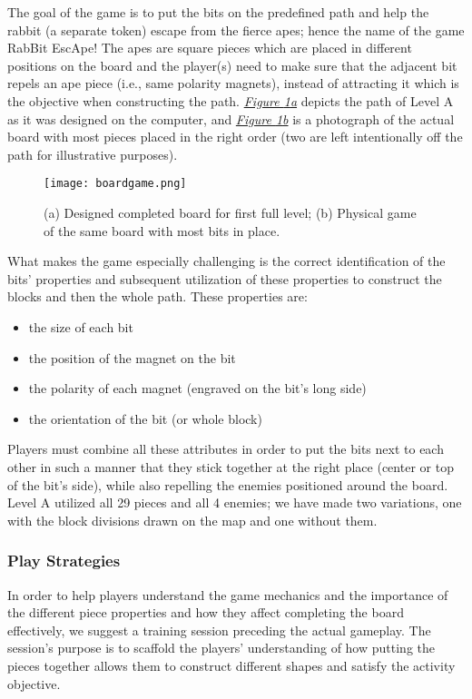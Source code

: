 \documentclass{acm_proc_article-sp}
\begin{document}
The goal of the game is to put the bits on the predefined path and help the rabbit (a separate token) escape from the fierce apes; hence the name of the game RabBit EscApe!
The apes are square pieces which are placed in different positions on the board and the player(s) need to make sure that the adjacent bit repels an ape piece (i.e., same polarity magnets), instead of attracting it which is the objective when constructing the path. 
{\em \hyperref[fig:board-game]{Figure \ref{fig:board-game}a}} depicts the path of Level A as it was designed on the computer, and {\em \hyperref[fig:board-game]{Figure \ref{fig:board-game}b}} is a photograph of the actual board with most pieces placed in the right order (two are left intentionally off the path for illustrative purposes).
\begin{figure}
  \texttt{[image: boardgame.png]}
  \caption{ (a) Designed completed board for first full level; (b) Physical game of the same board with most bits in place. }
  \label{fig:board-game}
\end{figure}

What makes the game especially challenging is the correct identification of the bits' properties and subsequent utilization of these properties to construct the blocks and then the whole path. These properties are:
\begin{itemize}
  \item{the size of each bit}
  \item{the position of the magnet on the bit}
  \item{the polarity of each magnet (engraved on the bit's long side)}
  \item{the orientation of the bit (or whole block)}
\end{itemize}

Players must combine all these attributes in order to put the bits next to each other in such a manner that they stick together at the right place (center or top of the bit's side), while also repelling the enemies positioned around the board.
Level A utilized all 29 pieces and all 4 enemies; we have made two variations, one with the block divisions drawn on the map and one without them.

\subsubsection{Play Strategies}
\label{sec:strategies}
In order to help players understand the game mechanics and the importance of the different piece properties and how they affect completing the board effectively, we suggest a training session preceding the actual gameplay.
The session's purpose is to scaffold the players' understanding of how putting the pieces together allows them to construct different shapes and satisfy the activity objective.
\end{document}
